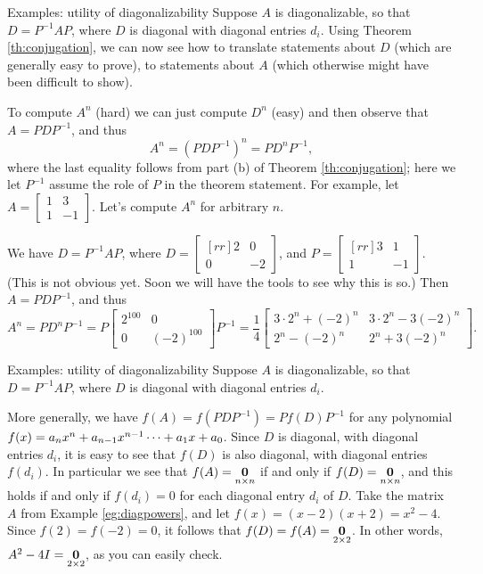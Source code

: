 \begin{frame}{Examples: utility of diagonalizability}
Suppose $A$ is diagonalizable, so that $D=P^{-1}AP$, where $D$ is diagonal with diagonal entries $d_i$. Using Theorem \ref{th:conjugation}, we can now see how to translate statements about $D$ (which are generally easy to prove), to statements about $A$ (which otherwise might have been difficult to show). 
\begin{example}\label{eg:diagpowers}
To compute $A^{n}$ (hard) we can just compute $D^{n}$ (easy) and then observe that $A=PDP^{-1}$, and thus 
\[
A^{n}=(PDP^{-1})^{n}=PD^{n}P^{-1},
\] 
where the last equality follows from part (b) of Theorem \ref{th:conjugation}; here we let $P^{-1}$ assume the role of $P$ in the theorem statement. 
\bpause
For example, let $A=\begin{bmatrix}
1&3\\
1&-1
\end{bmatrix}$. Let's compute $A^n$ for arbitrary $n$. 

We have $D=P^{-1}AP$, where $D=\begin{bmatrix}[rr]
2&0\\
0&-2
\end{bmatrix}$, and $P=\begin{bmatrix}[rr]
3&1\\
1&-1
\end{bmatrix}$. (This is not obvious yet. Soon we will have the tools to see why this is so.)
\bpause 
Then $A=PDP^{-1}$, and thus 
\[
A^{n}=PD^{n}P^{-1}=P\begin{bmatrix}
2^{100}&0\\
0&(-2)^{100}
\end{bmatrix}P^{-1}=\frac{1}{4}\begin{bmatrix}
3\cdot2^n+(-2)^n&3\cdot 2^n-3(-2)^{n}\\
2^{n}-(-2)^n&2^n+3(-2)^{n}
\end{bmatrix}.
\] 
\end{example}

\end{frame}
\begin{frame}{Examples: utility of diagonalizability}
Suppose $A$ is diagonalizable, so that $D=P^{-1}AP$, where $D$ is diagonal with diagonal entries $d_i$. 
\begin{example}
More generally, we have $f(A)=f(PDP^{-1})=Pf(D)P^{-1}$ for any polynomial $f(x)=a_nx^n+a_{n-1}x^{n-1}\cdots +a_1x+a_0$. Since $D$ is diagonal, with diagonal entries $d_i$, it is easy to see that $f(D)$ is also diagonal, with diagonal entries $f(d_i)$. 
\bpause
In particular we see that $f(A)=\underset{n\times n}{{\mathbf 0}}$ if and only if $f(D)=\underset{n\times n}{{\mathbf 0}}$, and this holds if and only if $f(d_i)=0$ for each diagonal entry $d_i$ of $D$.  
\bpause
Take the matrix $A$ from Example \ref{eg:diagpowers}, and let $f(x)=(x-2)(x+2)=x^2-4$. Since $f(2)=f(-2)=0$, it follows that $f(D)=f(A)=\underset{2\times 2}{{\mathbf 0}}$. In other words, $A^2-4I=\underset{2\times 2}{{\mathbf 0}}$, as you can easily check. 

\end{example}
\end{frame}
